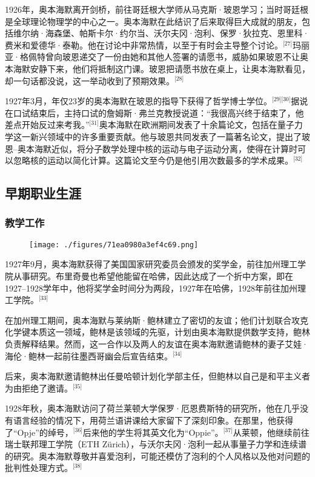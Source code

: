 1926年，奥本海默离开剑桥，前往哥廷根大学师从马克斯·玻恩学习；当时哥廷根是全球理论物理学的中心之一。奥本海默在此结识了后来取得巨大成就的朋友，包括维尔纳·海森堡、帕斯卡尔·约尔当、沃尔夫冈·泡利、保罗·狄拉克、恩里科·费米和爱德华·泰勒。他在讨论中非常热情，以至于有时会主导整个讨论。\(^\text{[27]}\)玛丽亚·格佩特曾向玻恩递交了一份由她和其他人签署的请愿书，威胁如果玻恩不让奥本海默安静下来，他们将抵制这门课。玻恩把请愿书放在桌上，让奥本海默看见，却一句话都没说，这一举动收到了预期效果。\(^\text{[28]}\)

1927年3月，年仅23岁的奥本海默在玻恩的指导下获得了哲学博士学位。\(^\text{[29][30]}\)据说在口试结束后，主持口试的詹姆斯·弗兰克教授说道：“我很高兴终于结束了，他差点开始反过来考我。”\(^\text{[31]}\)奥本海默在欧洲期间发表了十余篇论文，包括在量子力学这一新兴领域中的许多重要贡献。他与玻恩共同发表了一篇著名论文，提出了玻恩–奥本海默近似，将分子数学处理中核的运动与电子运动分离，使得在计算时可以忽略核的运动以简化计算。这篇论文至今仍是他引用次数最多的学术成果。\(^\text{[32]}\)
\subsection{早期职业生涯}
\subsubsection{教学工作}
\begin{figure}[ht]
\centering
\texttt{[image: ./figures/71ea0980a3ef4c69.png]}
\caption{} \label{fig_ABHM_3}
\end{figure}
1927年9月，奥本海默获得了美国国家研究委员会颁发的奖学金，前往加州理工学院从事研究。布里奇曼也希望他能留在哈佛，因此达成了一个折中方案，即在1927–1928学年中，他将奖学金时间分为两段，1927年在哈佛，1928年前往加州理工学院。\(^\text{[33]}\)

在加州理工期间，奥本海默与莱纳斯·鲍林建立了密切的友谊；他们计划联合攻克化学键本质这一领域，鲍林是该领域的先驱，计划由奥本海默提供数学支持，鲍林负责解释结果。然而，这一合作以及两人的友谊在奥本海默邀请鲍林的妻子艾娃·海伦·鲍林一起前往墨西哥幽会后宣告结束。\(^\text{[34]}\)

后来，奥本海默邀请鲍林出任曼哈顿计划化学部主任，但鲍林以自己是和平主义者为由拒绝了邀请。\(^\text{[35]}\)

1928年秋，奥本海默访问了荷兰莱顿大学保罗·厄恩费斯特的研究所，他在几乎没有语言经验的情况下，用荷兰语讲课给大家留下了深刻印象。在那里，他获得了“Opje”的绰号，\(^\text{[36]}\)后来他的学生将其英文化为“Oppie”。\(^\text{[37]}\)从莱顿，他继续前往瑞士联邦理工学院（ETH Zürich），与沃尔夫冈·泡利一起从事量子力学和连续谱的研究。奥本海默尊敬并喜爱泡利，可能还模仿了泡利的个人风格以及他对问题的批判性处理方式。\(^\text{[38]}\)

